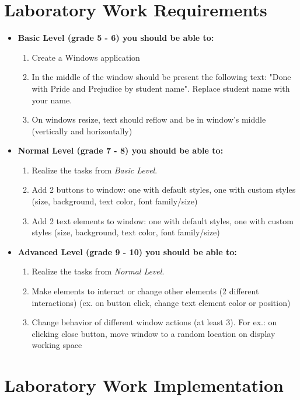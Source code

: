 \documentclass[12pt,a4paper,titlepage]{article}
\begin{document}
		\section{Laboratory Work Requirements}
		\begin{itemize}
			\item \textbf{Basic Level (grade 5 - 6) you should be able to:}
		\begin{enumerate}
			\item Create a Windows application
      		\item In the middle of the window should be present the following text: "Done with Pride and Prejudice by student name". Replace student name with your name.
      		\item On windows resize, text should reflow and be in window's middle (vertically and horizontally)
      	\end{enumerate}
			\item \textbf{Normal Level (grade 7 - 8) you should be able to:}
      	\begin{enumerate}
    			\item Realize the tasks from \textit{Basic Level}.
    			\item Add 2 buttons to window: one with default styles, one with custom styles (size, background, text color, font family/size)
    			\item Add 2 text elements to window: one with default styles, one with custom styles (size, background, text color, font family/size)
          \end{enumerate}
			\item \textbf{Advanced Level (grade 9 - 10) you should be able to:}
		  \begin{enumerate}
    			\item Realize the tasks from \textit{Normal Level}.
    			\item Make elements to interact or change other elements (2 different interactions)  (ex. on button click, change text element color or position)
    			\item Change behavior of different window actions (at least 3). For ex.: on clicking close button, move window to a random location on display working space 
          \end{enumerate}
		\end{itemize}
		\clearpage
	\pagebreak
	\newpage
	\section{Laboratory Work Implementation}
\end{document}
